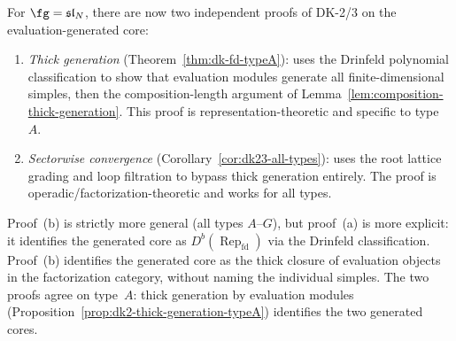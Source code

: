 \begin{remark}
\label{rem:two-dk-proofs}
For $\fg = \mathfrak{sl}_N$, there are now two independent proofs
of DK-2/3 on the evaluation-generated core:
\begin{enumerate}[label=\textup{(\alph*)}]
\item \emph{Thick generation}
  \textup{(}Theorem~\ref{thm:dk-fd-typeA}\textup{)}: uses the
  Drinfeld polynomial classification to show that evaluation modules
  generate all finite-dimensional simples, then the composition-length
  argument of Lemma~\ref{lem:composition-thick-generation}.  This proof
  is representation-theoretic and specific to type~$A$.
\item \emph{Sectorwise convergence}
  \textup{(}Corollary~\ref{cor:dk23-all-types}\textup{)}: uses
  the root lattice grading and loop filtration to bypass thick
  generation entirely.  The proof is
  operadic/factorization-theoretic and works for all types.
\end{enumerate}
Proof~(b) is strictly more general (all types $A$--$G$),
but proof~(a) is more explicit: it identifies the generated core as
$D^b(\operatorname{Rep}_{\mathrm{fd}})$ via the Drinfeld
classification.  Proof~(b) identifies the generated core as the
thick closure of evaluation objects in the factorization category,
without naming the individual simples.
The two proofs agree on type~$A$: thick generation by evaluation
modules (Proposition~\ref{prop:dk2-thick-generation-typeA})
identifies the two generated cores.
\end{remark}

